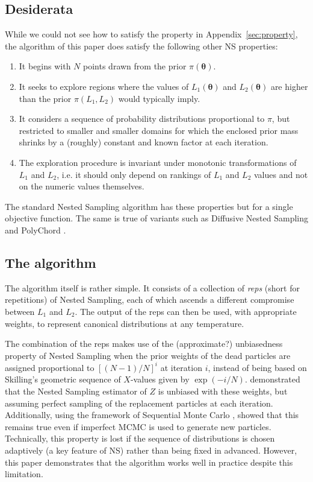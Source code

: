\documentclass[entropy,article,submit,moreauthors,pdftex,10pt,a4paper]{Definitions/mdpi}
\newcommand{\xx}{\boldsymbol{\theta}}
\begin{document}
\subsection{Desiderata}
While we could not see how to satisfy the property in
Appendix~\ref{sec:property},
the algorithm of this paper does satisfy the following other NS properties:
\begin{enumerate}
\item It begins with $N$ points drawn from the prior $\pi(\xx)$.
\item It seeks to explore regions where the values of
$L_1(\xx)$ and $L_2(\xx)$ are higher than the prior $\pi(L_1, L_2)$
would typically imply.
\item It considers a sequence of probability
distributions proportional to $\pi$, but restricted to smaller and smaller
domains for which the enclosed prior mass shrinks by a (roughly) constant and
known factor at each iteration.
\item The exploration procedure is invariant under monotonic transformations of
$L_1$ and $L_2$, i.e. it should only depend on rankings of $L_1$ and $L_2$
values and not on the numeric values themselves.
\end{enumerate}
The standard Nested Sampling algorithm has these properties but for a
single objective function. The same is true of variants such as
Diffusive Nested Sampling \citep{dns, dnest4} and PolyChord
\citep{handley2015polychord}.

\subsection{The algorithm}
The algorithm itself is rather simple. It consists of a collection of
{\em reps} (short for repetitions) of Nested Sampling, each of which ascends
a different compromise between $L_1$ and $L_2$. The output of the reps can then
be used, with appropriate weights, to represent canonical distributions at
any temperature.

The combination of the reps makes use of the (approximate?) unbiasedness
property of Nested Sampling when the prior weights of the dead particles are
assigned proportional to
$[(N-1)/N]^i$ at iteration $i$, instead of being based on
Skilling's geometric sequence of $X$-values given by $\exp(-i/N)$.
\citet{walter} demonstrated that the Nested Sampling estimator of $Z$
is unbiased with these weights, but assuming perfect sampling of the replacement
particles at each iteration. Additionally, using the framework of
Sequential Monte Carlo \citep{doucet2001introduction},
\citet{salomone2018unbiased} showed that this remains true even if imperfect
MCMC is used to generate new particles. Technically, this property is
lost if the sequence of distributions is chosen adaptively (a key feature of NS)
rather than being fixed in advanced. However, this paper demonstrates that the
algorithm works well in practice despite this limitation.
\end{document}
